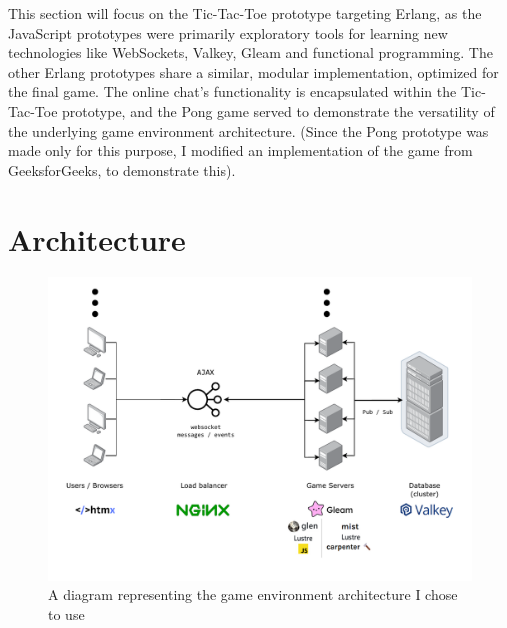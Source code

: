 \documentclass[]{interim}
\begin{document}
This section will focus on the Tic-Tac-Toe prototype targeting Erlang,
as the JavaScript prototypes were primarily exploratory tools for learning
new technologies like WebSockets, Valkey, Gleam and functional programming.
The other Erlang prototypes share a similar, modular implementation,
optimized for the final game. The online chat's functionality is
encapsulated within the Tic-Tac-Toe prototype, and the Pong game
served to demonstrate the versatility of the underlying game
environment architecture. (Since the Pong prototype was made only for this purpose,
I modified an implementation of the game from GeeksforGeeks, to demonstrate this).\cite{GeeksforGeeks_pong_2021}

\section{Architecture}

\begin{figure}[ht!]
  \centering
  \includegraphics[width=\linewidth]{architecture}
  \vspace*{-1.5cm}
  \caption{A diagram representing the game environment architecture I chose to use}
  \label{fig: 3}
\end{figure}

\newpage
\end{document}
